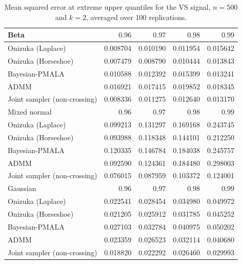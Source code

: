 \begin{table}[!htbp]
\centering
\small
\caption{Mean squared error at extreme upper quantiles for the VS signal, $n=500$ and $k=2$, averaged over 100 replications.}
\label{tab:ext_vs_mse}
\begin{tabular}{lrrrr}
\toprule
Beta & $0.96$ & $0.97$ & $0.98$ & $0.99$ \\
\midrule
Onizuka (Laplace) & 0.008704 & 0.010190 & 0.011954 & 0.015642 \\
Onizuka (Horseshoe) & 0.007479 & 0.008790 & 0.010444 & 0.013843 \\
Bayesian-PMALA & 0.010588 & 0.012392 & 0.015399 & 0.013241 \\
ADMM & 0.016921 & 0.017415 & 0.019852 & 0.018345 \\
Joint sampler (non-crossing) & 0.008336 & 0.011275 & 0.012640 & 0.013170 \\
\midrule
Mixed normal & $0.96$ & $0.97$ & $0.98$ & $0.99$ \\
\midrule
Onizuka (Laplace) & 0.099213 & 0.131297 & 0.169168 & 0.243745 \\
Onizuka (Horseshoe) & 0.093988 & 0.118348 & 0.144101 & 0.212250 \\
Bayesian-PMALA & 0.120335 & 0.146784 & 0.184038 & 0.245757 \\
ADMM & 0.092590 & 0.124361 & 0.184480 & 0.298003 \\
Joint sampler (non-crossing) & 0.076015 & 0.087959 & 0.103372 & 0.124001 \\
\midrule
Gaussian & $0.96$ & $0.97$ & $0.98$ & $0.99$ \\
\midrule
Onizuka (Laplace) & 0.022541 & 0.028454 & 0.034980 & 0.049972 \\
Onizuka (Horseshoe) & 0.021205 & 0.025912 & 0.031785 & 0.045252 \\
Bayesian-PMALA & 0.027103 & 0.032784 & 0.040975 & 0.050202 \\
ADMM & 0.023359 & 0.026523 & 0.032114 & 0.040680 \\
Joint sampler (non-crossing) & 0.018820 & 0.022292 & 0.026460 & 0.029993 \\
\bottomrule
\end{tabular}
\end{table}
